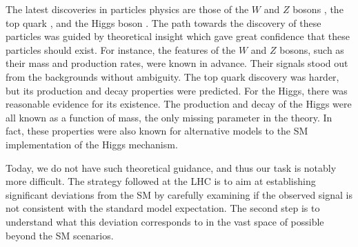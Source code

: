 The latest discoveries in particles physics are those of the 
$W$ and $Z$ bosons \cite{Arnison:1984qu,Bagnaia:1983zx}, the top quark  
\cite{PhysRevLett.74.2626,Abachi:1995iq}, and the Higgs boson \cite{atlas_higgs, cms_higgs}.
The path towards the discovery of these particles was guided by 
theoretical insight which gave great confidence that these particles 
should exist. 
For instance, the features of the $W$ and $Z$ bosons, such as their mass 
and production rates, were known in advance. 
Their signals stood out from the backgrounds without ambiguity.
The top quark discovery was harder, but its production and decay 
properties were predicted.
For the Higgs, there was reasonable evidence for its existence.
The production and decay of the Higgs were all known as a function of 
mass, the only missing parameter in the theory. 
In fact, these properties were also known for alternative models 
to the SM implementation of the Higgs mechanism.

Today, we do not have such theoretical guidance, and thus our task 
is notably more difficult.
The strategy followed at the LHC is to aim at establishing 
significant deviations from the SM by carefully examining 
if the observed signal is not consistent with the standard model expectation.
The second step is to understand what this deviation corresponds to 
in the vast space of possible beyond the SM scenarios.

